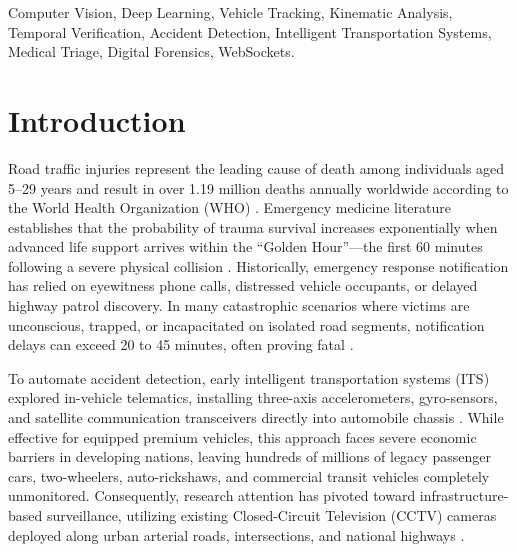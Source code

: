 \documentclass[conference]{IEEEtran}
\begin{document}
\begin{IEEEkeywords}
Computer Vision, Deep Learning, Vehicle Tracking, Kinematic Analysis, Temporal Verification, Accident Detection, Intelligent Transportation Systems, Medical Triage, Digital Forensics, WebSockets.
\end{IEEEkeywords}

\section{Introduction}
Road traffic injuries represent the leading cause of death among individuals aged 5--29 years and result in over 1.19 million deaths annually worldwide according to the World Health Organization (WHO) \cite{who2023}. Emergency medicine literature establishes that the probability of trauma survival increases exponentially when advanced life support arrives within the ``Golden Hour''---the first 60 minutes following a severe physical collision \cite{lerner2001golden}. Historically, emergency response notification has relied on eyewitness phone calls, distressed vehicle occupants, or delayed highway patrol discovery. In many catastrophic scenarios where victims are unconscious, trapped, or incapacitated on isolated road segments, notification delays can exceed 20 to 45 minutes, often proving fatal \cite{sanchez2010impact}.

To automate accident detection, early intelligent transportation systems (ITS) explored in-vehicle telematics, installing three-axis accelerometers, gyro-sensors, and satellite communication transceivers directly into automobile chassis \cite{white2011wreckwatch}. While effective for equipped premium vehicles, this approach faces severe economic barriers in developing nations, leaving hundreds of millions of legacy passenger cars, two-wheelers, auto-rickshaws, and commercial transit vehicles completely unmonitored. Consequently, research attention has pivoted toward infrastructure-based surveillance, utilizing existing Closed-Circuit Television (CCTV) cameras deployed along urban arterial roads, intersections, and national highways \cite{muhammad2019green}.
\end{document}
